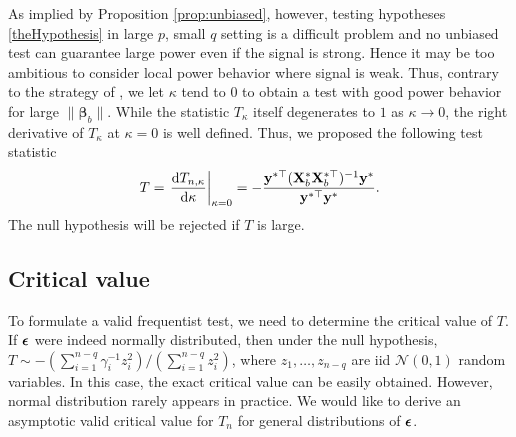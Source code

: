 \documentclass[11pt]{article}
\newcommand{\By}{\mathbf{y}}    \newcommand{\Bz}{\mathbf{z}}
\newcommand{\bfsym}[1]{\ensuremath{\boldsymbol{#1}}}
\def\bbeta{\bfsym \beta}
\theoremstyle{plain}
\theoremstyle{definition}
\theoremstyle{remark}
\begin{document}
As implied by Proposition \ref{prop:unbiased}, however, testing hypotheses \eqref{theHypothesis} in large $p$, small $q$ setting is a difficult problem and no unbiased test can guarantee large power even if the signal is strong.
Hence it may be too ambitious to consider local power behavior where signal is weak.
Thus, contrary to the strategy of \cite{Goeman2006}, we let $\kappa$ tend to $0$ to obtain a test with good power behavior for large $\|\bbeta_b\|$.
While the statistic $ T_{\kappa}$ itself degenerates to $1$ as $\kappa\to 0$,
the right derivative of $T_{\kappa}$ at $\kappa=0$ is well defined.
Thus, we proposed the following test statistic
\begin{equation*}
    T=
    \left.\frac{\mathrm d T_{n,\kappa}}{\mathrm d \kappa}\right|_{\kappa=0}
    =
    -
     \frac{\By^{*\top} ( \BX_b^* \BX_b^{*\top} )^{-1} \By^* }{\By^{*\top} \By^*} .
\end{equation*}
The null hypothesis will be rejected if $T$ is large.




\subsection{Critical value}
To formulate a valid frequentist test, we need to determine the critical value of $T$.
If $\bepsilon$ were indeed normally distributed, then under the null hypothesis,
    $T \sim
    -
    {(\sum_{i=1}^{n-q} \gamma_i^{-1} z_i^2)}/{(\sum_{i=1}^{n-q} z_i^2)}$,
where $z_1,\ldots, z_{n-q}$ are iid $\mathcal N(0,1)$ random variables.
In this case, the exact critical value can be easily obtained.
However, normal distribution rarely appears in practice.
We would like to derive an asymptotic valid critical value for $T_{n}$ for general distributions of $\bepsilon$.
\end{document}
